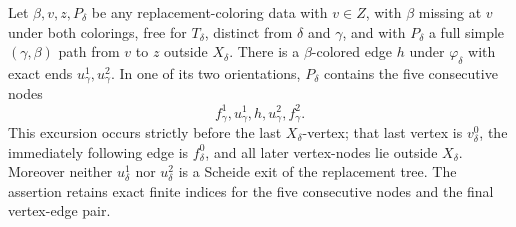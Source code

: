 \begin{helper}
Let $\beta,v,z,P_\delta$ be any replacement-coloring data with $v\in Z$,
with $\beta$ missing at $v$ under both colorings, free for $T_\delta$,
distinct from $\delta$ and $\gamma$, and with $P_\delta$ a full simple
$(\gamma,\beta)$ path from $v$ to $z$ outside $X_\delta$.  There is a
$\beta$-colored edge $h$ under $\varphi_\delta$ with exact ends
$u^1_\gamma,u^2_\gamma$.  In one of its two orientations,
$P_\delta$ contains the five consecutive nodes
\[
 f^1_\gamma,u^1_\gamma,h,u^2_\gamma,f^2_\gamma.
\]
This excursion occurs strictly before the last $X_\delta$-vertex; that
last vertex is $v^0_\delta$, the immediately following edge is
$f^0_\delta$, and all later vertex-nodes lie outside $X_\delta$.
Moreover neither $u^1_\delta$ nor $u^2_\delta$ is a Scheide exit of the
replacement tree.  The assertion retains exact finite indices for the
five consecutive nodes and the final vertex-edge pair.
\end{helper}
